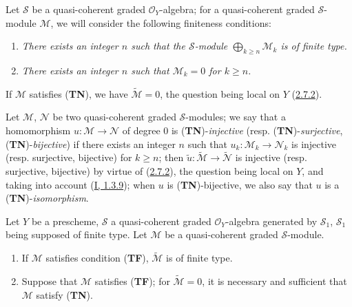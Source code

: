 \begin{env}[3.4.2]
\label{II.3.4.2}
Let $\mathcal{S}$ be a quasi-coherent graded $\mathcal{O}_Y$-algebra; for
a quasi-coherent graded $\mathcal{S}$-module $\mathcal{M}$, we will consider
the following finiteness conditions:
\begin{enumerate}
  \item[(\textbf{TF})] \emph{There exists an integer $n$ such that the
    $\mathcal{S}$-module $\bigoplus_{k\geq n}\mathcal{M}_k$ is of finite type.}
  \item[(\textbf{TN})] \emph{There exists an integer $n$ such that
    $\mathcal{M}_k=0$ for $k\geq n$.}
\end{enumerate}
If $\mathcal{M}$ satisfies (\textbf{TN}), we have
$\widetilde{\mathcal{M}}=0$, the question being local on $Y$
(\hyperref[II.2.7.2]{2.7.2}).

Let $\mathcal{M}$, $\mathcal{N}$ be two quasi-coherent graded
$\mathcal{S}$-modules; we say that a homomorphism
$u:\mathcal{M}\to\mathcal{N}$ of degree $0$ is
(\textbf{TN})-\emph{injective} (resp. (\textbf{TN})-\emph{surjective},
(\textbf{TN})-\emph{bijective}) if there exists an integer $n$ such that
$u_k:\mathcal{M}_k\to\mathcal{N}_k$ is injective (resp. surjective, bijective)
for $k\geq n$; then
$\widetilde{u}:\widetilde{\mathcal{M}}\to\widetilde{\mathcal{N}}$ is injective
(resp. surjective, bijective) by virtue of
(\hyperref[II.2.7.2]{2.7.2}), the question being local on $Y$, and taking
into account (\hyperref[I.1.3.9]{I, 1.3.9}); when $u$ is
(\textbf{TN})-bijective, we also say that $u$ is a
(\textbf{TN})-\emph{isomorphism}.
\end{env}

\begin{proposition}[3.4.3]
\label{II.3.4.3}
Let $Y$ be a prescheme, $\mathcal{S}$ a quasi-coherent graded
$\mathcal{O}_Y$-algebra generated by $\mathcal{S}_1$, $\mathcal{S}_1$ being
supposed of finite type. Let $\mathcal{M}$ be a quasi-coherent graded
$\mathcal{S}$-module.
\begin{enumerate}
  \item[\rm(i)] If $\mathcal{M}$ satisfies condition (\textbf{TF}),
    $\widetilde{\mathcal{M}}$ is of finite type.
  \item[\rm(ii)] Suppose that $\mathcal{M}$ satisfies (\textbf{TF}); for
    $\widetilde{\mathcal{M}}=0$, it is necessary and sufficient that
    $\mathcal{M}$ satisfy (\textbf{TN}).
\end{enumerate}
\end{proposition}

